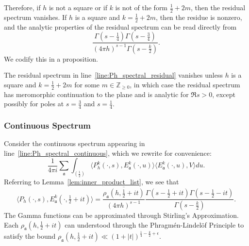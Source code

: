 Therefore, if $h$ is not a square or if $k$ is not of the form $\frac{1}{2} + 2m$, then
the residual spectrum vanishes.
If $h$ is a square and $k = \frac{1}{2} + 2m$, then the residue is nonzero, and the
analytic properties of the residual spectrum can be read directly from
\begin{equation}\label{eq:hyperboloid:residual_analytic_descriptor}
  \frac{\Gamma(s - \frac{1}{4}) \Gamma(s - \frac{3}{4})}{(4\pi h)^{s-1} \Gamma(s -
  \frac{k}{2})}.
\end{equation}
We codify this in a proposition.


\begin{proposition}\label{prop:hyperboloid_residual_props}
  The residual spectrum in line~\eqref{line:Ph_spectral_residual} vanishes unless $h$ is a
  square and $k = \frac{1}{2} + 2m$ for some $m \in \mathbb{Z}_{\geq 0}$, in which case
  the residual spectrum has meromorphic continuation to the plane and is analytic for $\Re
  s > 0$, except possibly for poles at $s = \frac{3}{4}$ and $s = \frac{1}{4}$.
\end{proposition}



\subsubsection*{Continuous Spectrum}



Consider the continuous spectrum appearing in line~\eqref{line:Ph_spectral_continuous},
which we rewrite for convenience:
\begin{equation}
  \frac{1}{4\pi i} \sum_{\mathfrak{a}} \int_{(\frac{1}{2})} \langle P_h^k(\cdot, s),
  E^k_{\mathfrak{a}}(\cdot, u) \rangle \langle E^k_{\mathfrak{a}}(\cdot, u), V \rangle du.
\end{equation}
Referring to Lemma~\ref{lem:inner_product_list}, we see that
\begin{equation}
  \langle P_h(\cdot, s), E_{\mathfrak{a}}^k(\cdot, \tfrac{1}{2} + it)\rangle =
  \frac{\overline{\rho_\mathfrak{a}(h, \tfrac{1}{2} + it)}}{(4\pi h)^{s-1}} \frac{\Gamma(s
  - \tfrac{1}{2} + it) \Gamma(s - \tfrac{1}{2} - it)}{\Gamma(s - \frac{k}{2})}.
\end{equation}
The Gamma functions can be approximated through Stirling's Approximation.
Each $\rho_\mathfrak{a}(h, \tfrac{1}{2} + it)$ can understood through the
Phragm\'en-Lindel\"of Principle to satisfy the bound $\rho_\mathfrak{a}(h, \frac{1}{2} +
it) \ll (1 + \lvert t \rvert)^{\frac{1}{4} - \frac{k}{2} + \epsilon}$.


